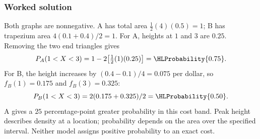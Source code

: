 \subsubsection*{Worked solution}\label{sol:sec:advanced0}
Both graphs are nonnegative. A has total area $\tfrac12(4)(0.5)=1$; B has trapezium area $4(0.1+0.4)/2=1$. For A, heights at $1$ and $3$ are $0.25$. Removing the two end triangles gives
\[
P_A(1<X<3)=1-2\bigl[\tfrac12(1)(0.25)\bigr]=\HLProbability{0.75}.
\]
For B, the height increases by $(0.4-0.1)/4=0.075$ per dollar, so $f_B(1)=0.175$ and $f_B(3)=0.325$:
\[
P_B(1<X<3)=2(0.175+0.325)/2=\HLProbability{0.50}.
\]
A gives a $25$ percentage-point greater probability in this cost band. Peak height describes density at a location; probability depends on the area over the specified interval. Neither model assigns positive probability to an exact cost.



